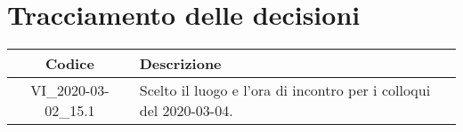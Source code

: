 \section*{Tracciamento delle decisioni}

\begin{center}
	\begin{longtable}{|c|p{12.25cm}|}
	\hline
	\rowcolor{lighter-grayer}
	\textbf{Codice} & \textbf{Descrizione} \\
	\hline
	\endfirsthead
	
	\hline
		VI\_2020-03-02\_15.1 & Scelto il luogo e l'ora di incontro per i colloqui del 2020-03-04. \\
	\hline

	\end{longtable}
\end{center}